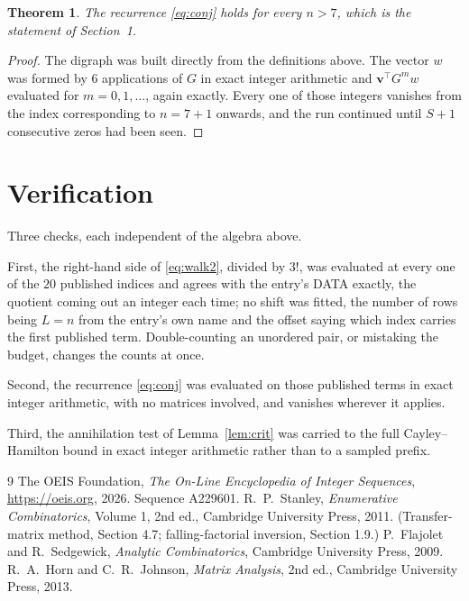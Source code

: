 \documentclass[11pt,a4paper]{article}
\theoremstyle{plain}
\newtheorem{theorem}{Theorem}
\theoremstyle{definition}
\begin{document}
\begin{theorem}
The recurrence \eqref{eq:conj} holds for every $n>7$, which is the statement of
Section~1.
\end{theorem}

\begin{proof}
The digraph was built directly from the definitions above. The vector $w$ was formed by
$6$ applications of $G$ in exact integer arithmetic and $\mathbf{v}^{\!\top}G^{m}w$
evaluated for $m=0,1,\dots$, again exactly. Every one of those integers vanishes from the
index corresponding to $n=7+1$ onwards, and the run continued until $S+1$ consecutive
zeros had been seen.
\end{proof}

\section{Verification}

Three checks, each independent of the algebra above.

First, the right-hand side of \eqref{eq:walk2}, divided by $3!$, was evaluated at every
one of the $20$ published indices and agrees with the entry's DATA exactly, the quotient
coming out an integer each time; no shift was fitted, the number of rows being $L=n$
from the entry's own name and the offset saying which index carries the first published term.
Double-counting an unordered pair, or mistaking the budget, changes the counts at once.

Second, the recurrence \eqref{eq:conj} was evaluated on those published terms in exact
integer arithmetic, with no matrices involved, and vanishes wherever it applies.

Third, the annihilation test of Lemma~\ref{lem:crit} was carried to the full
Cayley--Hamilton bound in exact integer arithmetic rather than to a sampled prefix.

\begin{thebibliography}{9}
 The OEIS Foundation, \emph{The On-Line Encyclopedia of Integer
Sequences}, \url{https://oeis.org}, 2026. Sequence A229601.
 R.~P.~Stanley, \emph{Enumerative Combinatorics}, Volume 1, 2nd ed.,
Cambridge University Press, 2011. (Transfer-matrix method, Section 4.7; falling-factorial
inversion, Section 1.9.)
 P.~Flajolet and R.~Sedgewick, \emph{Analytic Combinatorics}, Cambridge
University Press, 2009.
 R.~A.~Horn and C.~R.~Johnson, \emph{Matrix Analysis}, 2nd ed., Cambridge
University Press, 2013.
\end{thebibliography}
\end{document}
